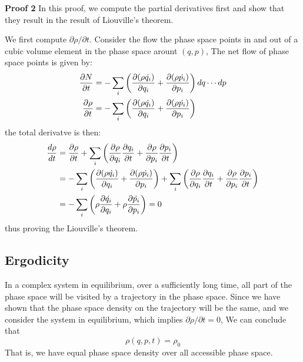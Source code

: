 \documentclass{article}
\begin{document}
\textbf{Proof 2} In this proof, we compute the partial derivatives first and show that they result in the result of Liouville's theorem.

We first compute $\partial \rho / \partial t$. Consider the flow the phase space points in and out of a cubic volume element 
in the phase space arount $(q,p)$, The net flow of phase space points is given by:
\begin{align}
    \frac{\partial N}{\partial t} 
    &= -\sum_i \left( \frac{\partial (\rho \dot{q_i})}{\partial q_i} + \frac{\partial (\rho \dot{p_i})}{\partial p_i} \right) dq \cdots dp \notag \\
    \frac{\partial \rho}{\partial t} 
    &= -\sum_i \left( \frac{\partial (\rho \dot{q_i})}{\partial q_i} + \frac{\partial (\rho \dot{p_i})}{\partial p_i} \right)
\end{align}
the total derivatve is then:
\begin{align}
    \frac{d\rho}{dt} &= \frac{\partial \rho}{\partial t}
    + \sum_i \left( \frac{\partial \rho}{\partial q_i}\frac{\partial q_i}{\partial t} + \frac{\partial \rho}{\partial p_i}\frac{\partial p_i}{\partial t} \right) \notag \\
    &= -\sum_i \left( \frac{\partial (\rho \dot{q_i})}{\partial q_i} + \frac{\partial (\rho \dot{p_i})}{\partial p_i} \right) 
    + \sum_i \left( \frac{\partial \rho}{\partial q_i}\frac{\partial q_i}{\partial t} + \frac{\partial \rho}{\partial p_i}\frac{\partial p_i}{\partial t} \right) \notag \\
    &= - \sum_i \left( \rho\frac{\partial \dot{q_i}}{\partial q_i} + \rho\frac{\partial \dot{p_i}}{\partial p_i}  \right) = 0
\end{align}
thus proving the Liouville's theorem.

\subsection{Ergodicity}
In a complex system in equilibrium, over a sufficiently long time, all part of the phase space will be visited by a trajectory in the phase space. Since we have shown that the 
phase space density on the trajectory will be the same, and we consider the system in equilibrium, which implies $\partial \rho / \partial t = 0$, We can conclude that 
\begin{equation}
    \rho(q,p,t) = \rho_0
\end{equation}
That is, we have equal phase space density over all accessible phase space.
\end{document}
